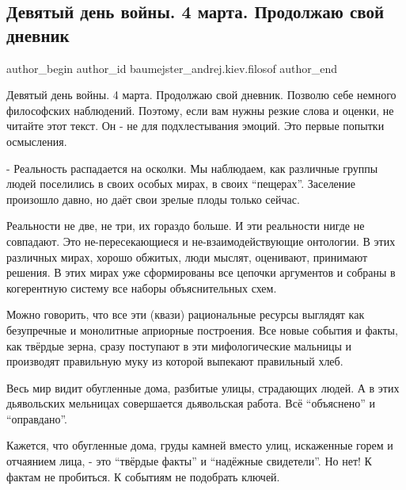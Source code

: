  
 
 
 
 
 
\subsection{Девятый день войны. 4 марта. Продолжаю свой дневник}
\label{sec:04_03_2022.fb.baumejster_andrej.kiev.filosof.1.dnevnik}
 
\ifcmt
 author_begin
   author_id baumejster_andrej.kiev.filosof
 author_end
\fi

Девятый день войны. 4 марта. Продолжаю свой дневник. Позволю себе немного
философских наблюдений. Поэтому, если вам нужны резкие слова и оценки, не
читайте этот текст. Он - не для подхлестывания эмоций. Это первые попытки
осмысления. 

- Реальность распадается на осколки. Мы наблюдаем, как различные группы людей
поселились в своих особых мирах, в своих \enquote{пещерах}. Заселение произошло
давно, но даёт свои зрелые плоды только сейчас. 

Реальности не две, не три, их гораздо больше. И эти реальности нигде не
совпадают. Это не-пересекающиеся и не-взаимодействующие онтологии. В этих
различных мирах, хорошо обжитых, люди мыслят, оценивают, принимают решения. В
этих мирах уже сформированы все цепочки аргументов и собраны в когерентную
систему все наборы объяснительных схем.

Можно говорить, что все эти (квази) рациональные ресурсы выглядят как
безупречные и монолитные априорные построения. Все новые события и факты, как
твёрдые зерна, сразу поступают в эти мифологические мальницы и производят
правильную муку из которой выпекают правильный хлеб.

Весь мир видит обугленные дома, разбитые улицы, страдающих людей. А в этих
дьявольских мельницах совершается дьявольская работа. Всё \enquote{объяснено} и
\enquote{оправдано}.

Кажется, что обугленные дома, груды камней вместо улиц, искаженные горем и
отчаянием лица, - это \enquote{твёрдые факты} и \enquote{надёжные свидетели}. Но нет! К фактам
не пробиться. К событиям не подобрать ключей.

